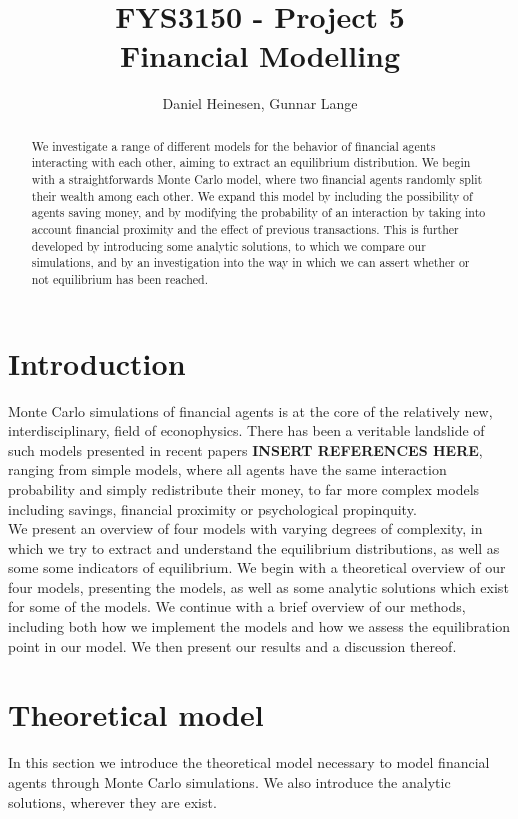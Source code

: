 \documentclass[a4paper, 10pt]{article}
\title{FYS3150 - Project 5\\
Financial Modelling}
\author{Daniel Heinesen, Gunnar Lange}
\begin{document}
\maketitle
\begin{abstract}
We investigate a range of different models for the behavior of financial agents interacting with each other, aiming to extract an equilibrium distribution. We begin with a straightforwards Monte Carlo model, where two financial agents randomly split their wealth among each other. We expand this model by including the possibility of agents saving money, and by modifying the probability of an interaction by taking into account financial proximity and the effect of previous transactions. This is further developed by introducing some analytic solutions, to which we compare our simulations, and by an investigation into the way in which we can assert whether or not equilibrium has been reached.
\end{abstract}
\tableofcontents
\section{Introduction}
Monte Carlo simulations of financial agents is at the core of the relatively new, interdisciplinary, field of econophysics. There has been a veritable landslide of such models presented in recent papers \textbf{INSERT REFERENCES HERE}, ranging from simple models, where all agents have the same interaction probability and simply redistribute their money, to far more complex models including savings, financial proximity or psychological propinquity.\\
\linebreak
We present an overview of four models with varying degrees of complexity, in which we try to extract and understand the equilibrium distributions, as well as some some indicators of equilibrium. We begin with a theoretical overview of our four models, presenting the models, as well as some analytic solutions which exist for some of the models. We continue with a brief overview of our methods, including both how we implement the models and how we assess the equilibration point in our model. We then present our results and a discussion thereof.
\section{Theoretical model}
In this section we introduce the theoretical model necessary to model financial agents through Monte Carlo simulations. We also introduce the analytic solutions, wherever they are exist. 
\end{document}
